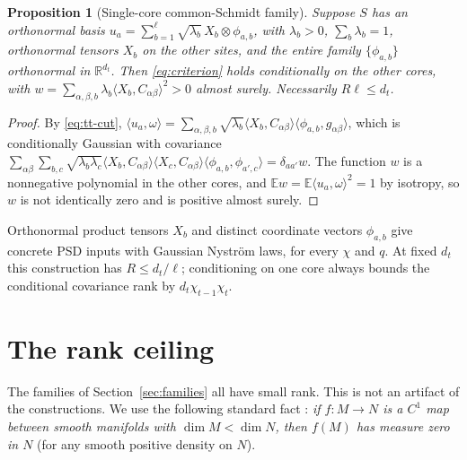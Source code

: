 \documentclass[11pt,a4paper]{article}
\newtheorem{proposition}[theorem]{Proposition}
\theoremstyle{definition}
\theoremstyle{remark}
\numberwithin{equation}{section}
\newcommand{\E}{\mathbb E}
\newcommand{\R}{\mathbb R}
\begin{document}
\begin{proposition}[Single-core common-Schmidt family]\label{prop:tt}
Suppose $S$ has an orthonormal basis
$u_a=\sum_{b=1}^\ell\sqrt{\lambda_b}\,X_b\otimes\phi_{a,b}$, with $\lambda_b>0$,
$\sum_b\lambda_b=1$, orthonormal tensors $X_b$ on the other sites, and the
entire family $\{\phi_{a,b}\}$ orthonormal in $\R^{d_t}$. Then
\eqref{eq:criterion} holds conditionally on the other cores, with
$w=\sum_{\alpha,\beta,b}\lambda_b\langle X_b,C_{\alpha\beta}\rangle^2>0$ almost
surely. Necessarily $R\ell\le d_t$.
\end{proposition}

\begin{proof}
By \eqref{eq:tt-cut},
$\langle u_a,\omega\rangle=\sum_{\alpha,\beta,b}\sqrt{\lambda_b}
\langle X_b,C_{\alpha\beta}\rangle\langle\phi_{a,b},g_{\alpha\beta}\rangle$,
which is conditionally Gaussian with covariance
$\sum_{\alpha\beta}\sum_{b,c}\sqrt{\lambda_b\lambda_c}\langle X_b,C_{\alpha\beta}\rangle
\langle X_c,C_{\alpha\beta}\rangle\langle\phi_{a,b},\phi_{a',c}\rangle=\delta_{aa'}w$.
The function $w$ is a nonnegative polynomial in the other cores, and
$\E w=\E\langle u_a,\omega\rangle^2=1$ by isotropy, so $w$ is not identically
zero and is positive almost surely.
\end{proof}

Orthonormal product tensors $X_b$ and distinct coordinate vectors $\phi_{a,b}$
give concrete PSD inputs with Gaussian Nystr\"om laws, for every $\chi$ and $q$.
At fixed $d_t$ this construction has $R\le d_t/\ell$; conditioning on one core
always bounds the conditional covariance rank by $d_t\chi_{t-1}\chi_t$.
\section{The rank ceiling}\label{sec:ceiling}

The families of Section~\ref{sec:families} all have small rank. This is not an
artifact of the constructions. We use the following standard fact
\cite[Corollary~6.11]{Lee}: \emph{if $f\colon M\to N$ is a $C^1$ map between
smooth manifolds with $\dim M<\dim N$, then $f(M)$ has measure zero in $N$}
(for any smooth positive density on $N$).
\end{document}
